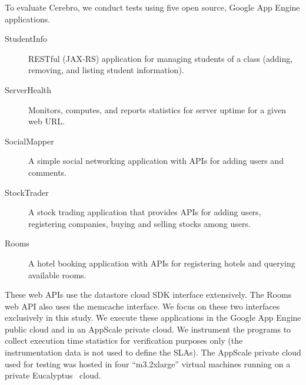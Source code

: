 To evaluate Cerebro, we conduct tests using five open source, Google
App Engine applications.

\begin{description}
\item[StudentInfo] RESTful (JAX-RS) application for managing
students of a class (adding, removing, and listing student information).
\item[ServerHealth] Monitors, computes, and reports statistics for server
uptime for a given web URL.
\item[SocialMapper] A simple social networking application with APIs for
adding users and comments.
\item[StockTrader] A stock trading application that
provides APIs for adding users, registering companies, buying and selling
stocks among users. 
\item[Rooms] A hotel booking application with APIs
for registering hotels and querying available rooms.
\end{description}

These web APIs use the datastore
cloud SDK interface extensively. The Rooms web API also uses the
memcache interface. We focus on these two interfaces exclusively in this
study. We execute these applications in the Google App Engine public cloud
and in an AppScale private cloud.  We instrument the programs to collect
execution time statistics for verification purposes only 
(the instrumentation data is not used to define
the SLAs).  The AppScale private cloud used for testing was
hosted in four ``m3.2xlarge'' virtual machines running on a private
Eucalyptus~\cite{eucalyptus09} cloud.



